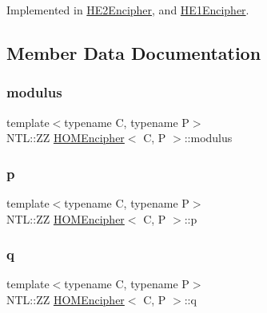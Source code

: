 Implemented in \hyperlink{classHE2Encipher_a802a75d83bb833bf458a1e89792026bc}{H\+E2\+Encipher}, and \hyperlink{classHE1Encipher_a0aa1ef94d9147591367dbbc6ce03e5e1}{H\+E1\+Encipher}.



\subsection{Member Data Documentation}
\mbox{\label{classHOMEncipher_aa645061096356f6e2fd5ad3f0dfc1fc1}} 
\subsubsection{\texorpdfstring{modulus}{modulus}}
{\footnotesize\ttfamily template$<$typename C, typename P$>$ \\
N\+T\+L\+::\+ZZ \hyperlink{classHOMEncipher}{H\+O\+M\+Encipher}$<$ C, P $>$\+::modulus\hspace{0.3cm}{\ttfamily [protected]}}

\mbox{\label{classHOMEncipher_a57eb1b665612ec7caaa601af9b809866}} 
\subsubsection{\texorpdfstring{p}{p}}
{\footnotesize\ttfamily template$<$typename C, typename P$>$ \\
N\+T\+L\+::\+ZZ \hyperlink{classHOMEncipher}{H\+O\+M\+Encipher}$<$ C, P $>$\+::p\hspace{0.3cm}{\ttfamily [protected]}}

\mbox{\label{classHOMEncipher_ab9e6d7d4d4574c74a08169441e3213b2}} 
\subsubsection{\texorpdfstring{q}{q}}
{\footnotesize\ttfamily template$<$typename C, typename P$>$ \\
N\+T\+L\+::\+ZZ \hyperlink{classHOMEncipher}{H\+O\+M\+Encipher}$<$ C, P $>$\+::q\hspace{0.3cm}{\ttfamily [protected]}}

